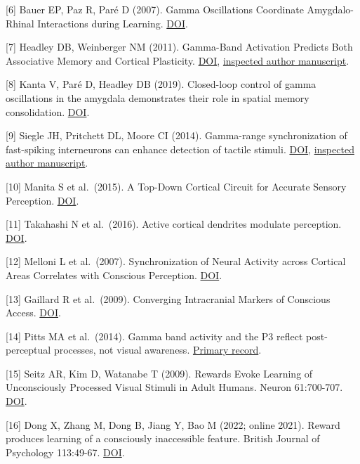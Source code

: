 \documentclass[
  american,
  11pt,
  letterpaper,
]{article}
\begin{document}
{[}6{]} Bauer EP, Paz R, Paré D (2007). Gamma Oscillations Coordinate Amygdalo-Rhinal Interactions during Learning. \href{https://doi.org/10.1523/JNEUROSCI.2153-07.2007}{DOI}.

{[}7{]} Headley DB, Weinberger NM (2011). Gamma-Band Activation Predicts Both Associative Memory and Cortical Plasticity. \href{https://doi.org/10.1523/JNEUROSCI.2528-11.2011}{DOI}, \href{https://pmc.ncbi.nlm.nih.gov/articles/PMC3180928/}{inspected author manuscript}.

{[}8{]} Kanta V, Paré D, Headley DB (2019). Closed-loop control of gamma oscillations in the amygdala demonstrates their role in spatial memory consolidation. \href{https://doi.org/10.1038/s41467-019-11938-8}{DOI}.

{[}9{]} Siegle JH, Pritchett DL, Moore CI (2014). Gamma-range synchronization of fast-spiking interneurons can enhance detection of tactile stimuli. \href{https://doi.org/10.1038/nn.3797}{DOI}, \href{https://pmc.ncbi.nlm.nih.gov/articles/PMC4229565/}{inspected author manuscript}.

{[}10{]} Manita S et al.~(2015). A Top-Down Cortical Circuit for Accurate Sensory Perception. \href{https://doi.org/10.1016/j.neuron.2015.05.006}{DOI}.

{[}11{]} Takahashi N et al.~(2016). Active cortical dendrites modulate perception. \href{https://doi.org/10.1126/science.aah6066}{DOI}.

{[}12{]} Melloni L et al.~(2007). Synchronization of Neural Activity across Cortical Areas Correlates with Conscious Perception. \href{https://doi.org/10.1523/JNEUROSCI.4623-06.2007}{DOI}.

{[}13{]} Gaillard R et al.~(2009). Converging Intracranial Markers of Conscious Access. \href{https://doi.org/10.1371/journal.pbio.1000061}{DOI}.

{[}14{]} Pitts MA et al.~(2014). Gamma band activity and the P3 reflect post-perceptual processes, not visual awareness. \href{https://pubmed.ncbi.nlm.nih.gov/25063731/}{Primary record}.

{[}15{]} Seitz AR, Kim D, Watanabe T (2009). Rewards Evoke Learning of Unconsciously Processed Visual Stimuli in Adult Humans. Neuron 61:700-707. \href{https://doi.org/10.1016/j.neuron.2009.01.016}{DOI}.

{[}16{]} Dong X, Zhang M, Dong B, Jiang Y, Bao M (2022; online 2021). Reward produces learning of a consciously inaccessible feature. British Journal of Psychology 113:49-67. \href{https://doi.org/10.1111/bjop.12518}{DOI}.
\end{document}

